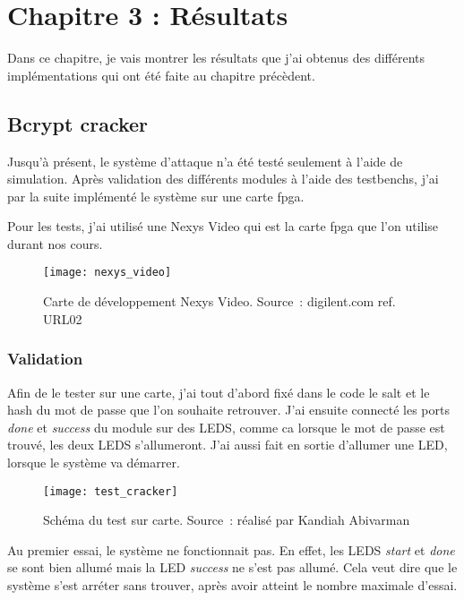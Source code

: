 \chapter{Chapitre 3 : Résultats}

Dans ce chapitre, je vais montrer les résultats que j'ai obtenus des différents implémentations qui ont été faite au chapitre précèdent.  

\section{Bcrypt cracker}

Jusqu'à présent, le système d'attaque n'a été testé seulement à l'aide de simulation. 
Après validation des différents modules à l'aide des testbenchs, j'ai par la suite implémenté le système sur une carte \gls{fpga}.

Pour les tests, j'ai utilisé une Nexys Video qui est la carte \gls{fpga} que l'on utilise durant nos cours.

\begin{figure}[tbph!]
	\centering
	\texttt{[image: nexys\_video]}
	\caption[Carte de développement Nexys Video]{Carte de développement Nexys Video. Source : digilent.com ref. URL02}
	\label{fig:nexys_video}
\end{figure}

\subsection{Validation}

Afin de le tester sur une carte, j'ai tout d'abord fixé dans le code le salt et le hash du mot de passe que l'on souhaite retrouver.
J'ai ensuite connecté les ports \textit{done} et \textit{success} du module sur des LEDS, comme ca lorsque le mot de passe est trouvé, les deux LEDS s'allumeront.
J'ai aussi fait en sortie d'allumer une LED, lorsque le système va démarrer.

\begin{figure}[tbph!]
	\centering
	\texttt{[image: test\_cracker]}
	\caption[Schéma du test sur carte]{Schéma du test sur carte. Source : réalisé par Kandiah Abivarman}
	\label{fig:test_cracker}
\end{figure}

Au premier essai, le système ne fonctionnait pas. En effet, les LEDS \textit{start} et \textit{done} se sont bien allumé mais la LED \textit{success} ne s'est pas allumé.
Cela veut dire que le système s'est arréter sans trouver, après avoir atteint le nombre maximale d'essai.

